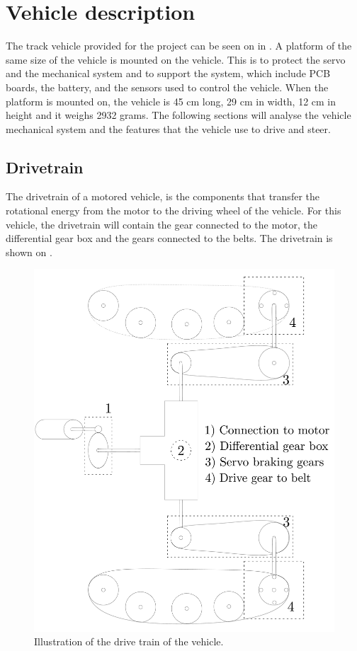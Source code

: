\section{Vehicle description} \label{sec:Vehicledescription}
The track vehicle provided for the project can be seen on  in . A platform of the same size of the vehicle  is mounted on the vehicle. This is to protect the servo and the mechanical system and to support the system, which include PCB boards, the battery, and the sensors used to control the vehicle. When the platform is mounted on, the vehicle is 45 cm long, 29 cm in width, 12 cm in height and it weighs 2932 grams.
The following sections will analyse the vehicle mechanical system and the features that the vehicle use to drive and steer.

\subsection{Drivetrain}

The drivetrain of a motored vehicle, is the components that transfer the rotational energy from the motor to the driving wheel of the vehicle. For this vehicle, the drivetrain will contain the gear connected to the motor, the differential gear box and the gears connected to the belts. The drivetrain is shown on .

\begin{figure}[H]
	\centering
	\includegraphics[scale=0.2]{figures/vehicleDescriptionDriveTrain.pdf}
	\caption{Illustration of the drive train of the vehicle.}
	\label{vehicleDescriptionDriveTrain}
\end{figure}

